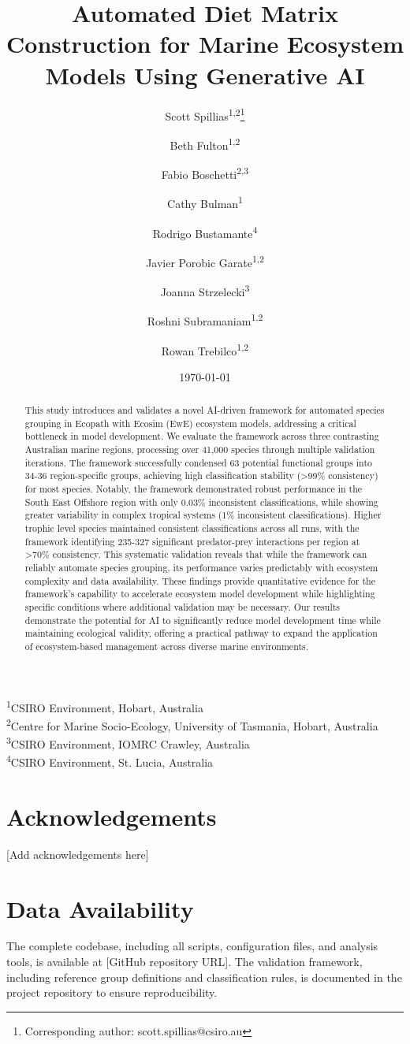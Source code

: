 \documentclass[12pt,a4paper]{article}
\title{Automated Diet Matrix Construction for Marine Ecosystem Models Using Generative AI}
\author{Scott Spillias\textsuperscript{1,2}\thanks{Corresponding author: scott.spillias@csiro.au} \and
Beth Fulton\textsuperscript{1,2} \and
Fabio Boschetti\textsuperscript{2,3} \and
Cathy Bulman\textsuperscript{1} \and
Rodrigo Bustamante\textsuperscript{4} \and
Javier Porobic Garate\textsuperscript{1,2} \and
Joanna Strzelecki\textsuperscript{3} \and
Roshni Subramaniam\textsuperscript{1,2} \and
Rowan Trebilco\textsuperscript{1,2}}
\date{\today}  %
\newcommand{\affiliations}{
\noindent\textsuperscript{1}CSIRO Environment, Hobart, Australia\\
\textsuperscript{2}Centre for Marine Socio-Ecology, University of Tasmania, Hobart, Australia\\
\textsuperscript{3}CSIRO Environment, IOMRC Crawley, Australia\\
\textsuperscript{4}CSIRO Environment, St. Lucia, Australia
}
\begin{document}
\linenumbers
\maketitle
\affiliations

\begin{abstract}
This study introduces and validates a novel AI-driven framework for automated species grouping in Ecopath with Ecosim (EwE) ecosystem models, addressing a critical bottleneck in model development. We evaluate the framework across three contrasting Australian marine regions, processing over 41,000 species through multiple validation iterations. The framework successfully condensed 63 potential functional groups into 34-36 region-specific groups, achieving high classification stability (>99\% consistency) for most species. Notably, the framework demonstrated robust performance in the South East Offshore region with only 0.03\% inconsistent classifications, while showing greater variability in complex tropical systems (1\% inconsistent classifications). Higher trophic level species maintained consistent classifications across all runs, with the framework identifying 235-327 significant predator-prey interactions per region at >70\% consistency. This systematic validation reveals that while the framework can reliably automate species grouping, its performance varies predictably with ecosystem complexity and data availability. These findings provide quantitative evidence for the framework's capability to accelerate ecosystem model development while highlighting specific conditions where additional validation may be necessary. Our results demonstrate the potential for AI to significantly reduce model development time while maintaining ecological validity, offering a practical pathway to expand the application of ecosystem-based management across diverse marine environments.
\end{abstract}






\section*{Acknowledgements}
[Add acknowledgements here]

\section*{Data Availability}
The complete codebase, including all scripts, configuration files, and analysis tools, is available at [GitHub repository URL]. The validation framework, including reference group definitions and classification rules, is documented in the project repository to ensure reproducibility.
\end{document}

